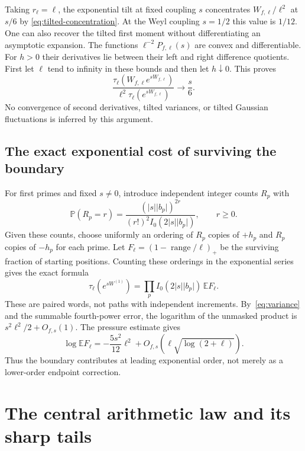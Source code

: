 \documentclass[11pt,reqno]{amsart}
\numberwithin{equation}{section}
\newcommand{\E}{\mathbb E}
\newcommand{\abs}[1]{\lvert#1\rvert}
\begin{document}
Taking $r_\ell=\ell$, the exponential tilt at fixed coupling $s$
concentrates $W_{f,\ell}/\ell^2$ at $s/6$ by
\eqref{eq:tilted-concentration}. At the Weyl coupling $s=1/2$
this value is $1/12$.
One can also recover the tilted first moment without differentiating
an asymptotic expansion. The functions
$\ell^{-2}P_{f,\ell}(s)$ are convex and differentiable. For $h>0$
their derivatives lie between their left and right difference
quotients. First let $\ell$ tend to infinity in these bounds and
then let $h\downarrow0$. This proves
\begin{equation}\label{eq:tilted-mean}
 \frac{\tau_\ell(W_{f,\ell}e^{sW_{f,\ell}})}
        {\ell^2\tau_\ell(e^{sW_{f,\ell}})}\longrightarrow\frac s6.
\end{equation}
No convergence of second derivatives, tilted variances, or
tilted Gaussian fluctuations is inferred by this argument.

\subsection*{The exact exponential cost of surviving the boundary}

For first primes and fixed $s\ne0$, introduce independent integer
counts $R_p$ with
\[
 \mathbb P(R_p=r)=\frac{(\abs s\abs{b_p})^{2r}}
                         {(r!)^2I_0(2\abs s\abs{b_p})},\qquad r\ge0.
\]
Given these counts, choose uniformly an ordering of $R_p$ copies
of $+h_p$ and $R_p$ copies of $-h_p$ for each prime. Let
$F_\ell=(1-\operatorname{range}/\ell)_+$ be the surviving
fraction of starting positions. Counting these orderings in the
exponential series gives the exact formula
\begin{equation}\label{eq:survival-identity}
 \tau_\ell(e^{sW^{(1)}})
       =\prod_pI_0(2\abs s\abs{b_p})\,\E F_\ell.
\end{equation}
These are paired words, not paths with independent increments.
By~\eqref{eq:variance} and the summable fourth-power error,
the logarithm of the unmasked product is
$s^2\ell^2/2+O_{f,s}(1)$. The pressure estimate gives
\begin{equation}\label{eq:survival-rate}
 \log\E F_\ell=-\frac{5s^2}{12}\ell^2
                  +O_{f,s}(\ell\sqrt{\log(2+\ell)}).
\end{equation}
Thus the boundary contributes at leading exponential order,
not merely as a lower-order endpoint correction.

\section{The central arithmetic law and its sharp tails}\label{sec:central}
\end{document}
